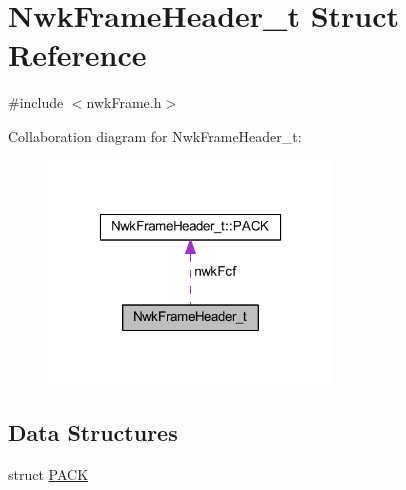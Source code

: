 \hypertarget{struct_nwk_frame_header__t}{\section{Nwk\-Frame\-Header\-\_\-t Struct Reference}
\label{struct_nwk_frame_header__t}
}


{\ttfamily \#include $<$nwk\-Frame.\-h$>$}



Collaboration diagram for Nwk\-Frame\-Header\-\_\-t\-:
\nopagebreak
\begin{figure}[H]
\begin{center}
\leavevmode
\includegraphics[width=214pt]{struct_nwk_frame_header__t__coll__graph}
\end{center}
\end{figure}
\subsection*{Data Structures}
\begin{DoxyCompactItemize}
\item 
struct \hyperlink{struct_nwk_frame_header__t_1_1_p_a_c_k}{P\-A\-C\-K}
\end{DoxyCompactItemize}

